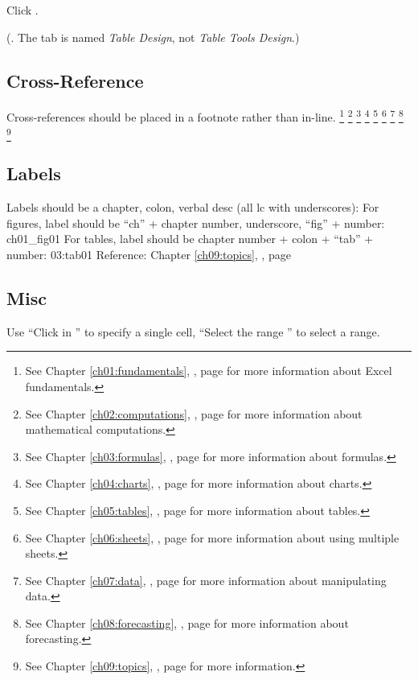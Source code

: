 \begin{enumerate}[resume]
Click .

(. The tab is named \textit{Table Design}, not \textit{Table Tools Design}.)

\subsection{Cross-Reference}
Cross-references should be placed in a footnote rather than in-line.
\footnote{See Chapter \ref{ch01:fundamentals}, , page \pageref{ch01:fundamentals} for more information about Excel fundamentals.}
\footnote{See Chapter \ref{ch02:computations}, , page \pageref{ch02:computations} for more information about mathematical computations.}
\footnote{See Chapter \ref{ch03:formulas}, , page \pageref{ch03:formulas} for more information about formulas.}
\footnote{See Chapter \ref{ch04:charts}, , page \pageref{ch04:charts} for more information about charts.}
\footnote{See Chapter \ref{ch05:tables}, , page \pageref{ch05:tables} for more information about tables.}
\footnote{See Chapter \ref{ch06:sheets}, , page \pageref{ch06:sheets} for more information about using multiple sheets.}
\footnote{See Chapter \ref{ch07:data}, , page \pageref{ch07:data} for more information about manipulating data.}
\footnote{See Chapter \ref{ch08:forecasting}, , page \pageref{ch08:forecasting} for more information about forecasting.}
\footnote{See Chapter \ref{ch09:topics}, , page \pageref{ch09:topics} for more information.}

\subsection{Labels}
Labels should be a chapter, colon, verbal desc (all lc with underscores): \label{03:title}
For figures, label should be ``ch'' + chapter number, underscore, ``fig'' + number: ch01_fig01
For tables, label should be chapter number + colon + ``tab'' + number: 03:tab01
Reference: Chapter \ref{ch09:topics}, , page \pageref{ch09:topics}

\subsection{Misc}
Use ``Click in '' to specify a single cell, ``Select the range '' to select a range.


\end{enumerate}
